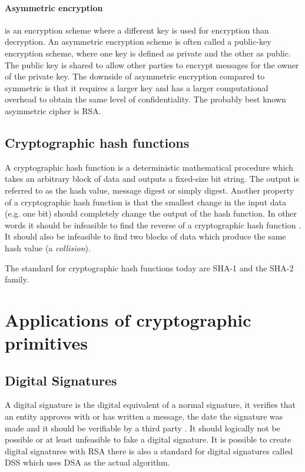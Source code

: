 \documentclass[pdftex,english,10pt,b5paper,twoside]{book}
\begin{document}
\paragraph{Asymmetric encryption} is an encryption scheme where a different key
is used for encryption than decryption\cite[p. 259]{stallings}. An asymmetric
encryption scheme is often called a public-key encryption scheme, where one key
is defined as private and the other as public. The public key is shared to
allow other parties to encrypt messages for the owner of the private key. The
downside of asymmetric encryption compared to symmetric is that it requires a
larger key and has a larger computational overhead to obtain the same level of
confidentiality. The probably best known asymmetric cipher is \ac{RSA}.

\subsection{Cryptographic hash functions}
A cryptographic hash function is a deterministic mathematical procedure which
takes an arbitrary block of data and outputs a fixed-size bit string. The output
is referred to as the hash value, message digest or simply digest.
Another property of a cryptographic hash function is that the smallest change in
the input data (e.g. one bit) should completely change the output of the hash
function. In other words it should be infeasible to find the reverse of a
cryptographic hash function \cite[p. 335]{stallings}. It should also be infeasible to
find two blocks of data which produce the same hash value (a \emph{collision}).

The standard for cryptographic hash functions today are \ac{SHA}-1 and the
\ac{SHA}-2 family.

\section{Applications of cryptographic primitives}

\subsection{Digital Signatures}
A digital signature is the digital equivalent of a normal signature, it
verifies that an entity approves with or has written a message, the date the
signature was made and it should be verifiable by a third party \cite[p.
379]{stallings}. It should logically not be possible or at least unfeasible to
fake a digital signature. It is possible to create digital signatures with
\ac{RSA} there is also a standard for digital signatures called \ac{DSS} which
uses \ac{DSA} as the actual algorithm.
\end{document}
